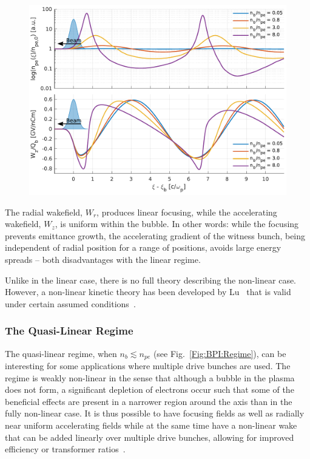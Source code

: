 \begin{figure}[hbt]
    \centering
    \includegraphics[width=0.875\linewidth,trim={0mm 0mm 0mm 0mm},clip]{figures/Density}
    \caption{\label{Fig:BPI:Density} }
\end{figure}

The radial wakefield, $W_{r}$, produces linear focusing, while the accelerating wakefield, $W_{z}$, is uniform within the bubble. In other words: while the focusing prevents emittance growth, the accelerating gradient of the witness bunch, being independent of radial position for a range of positions, avoids large energy spreads -- both disadvantages with the linear regime.

Unlike in the linear case, there is no full theory describing the non-linear case. However, a non-linear kinetic theory has been developed by Lu \etal ~that is valid under certain assumed conditions~\cite{lu:2006a,lu:2006}.

\subsubsection{The Quasi-Linear Regime}
\label{Int:BPI:QLin}

The quasi-linear regime, when $n_{b} \lesssim n_{pe}$ (see Fig.~\ref{Fig:BPI:Regime}), can be interesting for some applications where multiple drive bunches are used. The regime is weakly non-linear in the sense that although a bubble in the plasma does not form, a significant depletion of electrons occur such that some of the beneficial effects are present in a narrower region around the axis than in the fully non-linear case. It is thus possible to have focusing fields as well as radially near uniform accelerating fields while at the same time have a non-linear wake that can be added linearly over multiple drive bunches, allowing for improved efficiency or transformer ratios~\cite{muggli:2017,rosenzweig:2010}.

